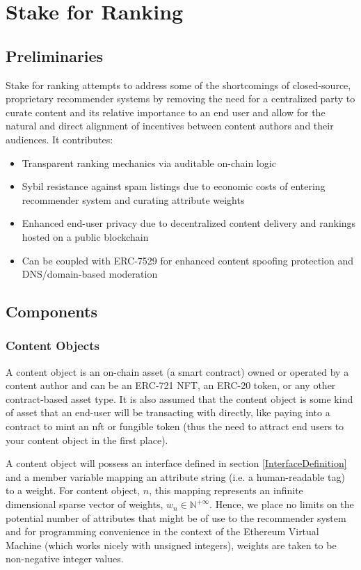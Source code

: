 \section{Stake for Ranking} 
\label{section:ProtocolDescription}

\subsection{Preliminaries}
Stake for ranking attempts to address some of the shortcomings of closed-source, proprietary recommender systems by removing the need for a centralized party to curate content and its relative importance to an end user and allow for the natural and direct alignment of incentives between content authors and their audiences. It contributes:
\begin{itemize}
    \item Transparent ranking mechanics via auditable on-chain logic
    \item Sybil resistance against spam listings due to economic costs of entering recommender system and curating attribute weights
    \item Enhanced end-user privacy due to decentralized content delivery and rankings hosted on a public blockchain
    \item Can be coupled with ERC-7529 \cite{chapman2023erc7529} for enhanced content spoofing protection and DNS/domain-based moderation
\end{itemize}

\subsection{Components}
\subsubsection{Content Objects}
\label{ContentObjectDefinition}

A content object is an on-chain asset (a smart contract) owned or operated by a content author and can be an ERC-721 NFT, an ERC-20 token, or any other contract-based asset type. It is also assumed that the content object is some kind of asset that an end-user will be transacting with directly, like paying into a contract to mint an nft or fungible token (thus the need to attract end users to your content object in the first place). 

A content object will possess an interface defined in section \ref{InterfaceDefinition} and a member variable mapping an attribute string (i.e. a human-readable tag) to a weight. For content object, $n$, this mapping represents an infinite dimensional sparse vector of weights, $w_n \in \mathbb{N}^{+\infty}$. Hence, we place no limits on the potential number of attributes that might be of use to the recommender system and for programming convenience in the context of the Ethereum Virtual Machine \cite{wood2014ethereum} (which works nicely with unsigned integers), weights are taken to be non-negative integer values. 

